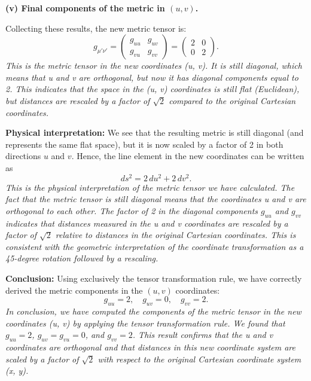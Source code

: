     \textbf{(v) Final components of the metric in \((u,v)\).}

    Collecting these results, the new metric tensor is:
    \[
        g_{\mu' \nu'}
        =
        \begin{pmatrix}
            g_{uu} & g_{uv} \\
            g_{vu} & g_{vv}
        \end{pmatrix}
        =
        \begin{pmatrix}
            2 & 0 \\
            0 & 2
        \end{pmatrix}.
    \]
    \emph{This is the metric tensor in the new coordinates (u, v). It is still diagonal, which means that u and v are orthogonal, but now it has diagonal components equal to 2. This indicates that the space in the (u, v) coordinates is still flat (Euclidean), but distances are rescaled by a factor of \(\sqrt{2}\) compared to the original Cartesian coordinates.}

    \textbf{Physical interpretation:} We see that the resulting metric is still diagonal (and represents the same flat space), but it is now scaled by a factor of 2 in both directions \(u\) and \(v\). Hence, the line element in the new coordinates can be written as
    \[
        ds^2 = 2\,du^2 + 2\,dv^2.
    \]
    \emph{This is the physical interpretation of the metric tensor we have calculated. The fact that the metric tensor is still diagonal means that the coordinates u and v are orthogonal to each other. The factor of 2 in the diagonal components \(g_{uu}\) and \(g_{vv}\) indicates that distances measured in the u and v coordinates are rescaled by a factor of \(\sqrt{2}\) relative to distances in the original Cartesian coordinates. This is consistent with the geometric interpretation of the coordinate transformation as a 45-degree rotation followed by a rescaling.}

    \textbf{Conclusion:}
    Using exclusively the tensor transformation rule, we have correctly derived the metric components in the \((u, v)\) coordinates:
    \[
        g_{uu} = 2,
        \quad
        g_{uv} = 0,
        \quad
        g_{vv} = 2.
    \]
    \emph{In conclusion, we have computed the components of the metric tensor in the new coordinates (u, v) by applying the tensor transformation rule. We found that \(g_{uu} = 2\), \(g_{uv} = g_{vu} = 0\), and \(g_{vv} = 2\). This result confirms that the u and v coordinates are orthogonal and that distances in this new coordinate system are scaled by a factor of \(\sqrt{2}\) with respect to the original Cartesian coordinate system (x, y).}

